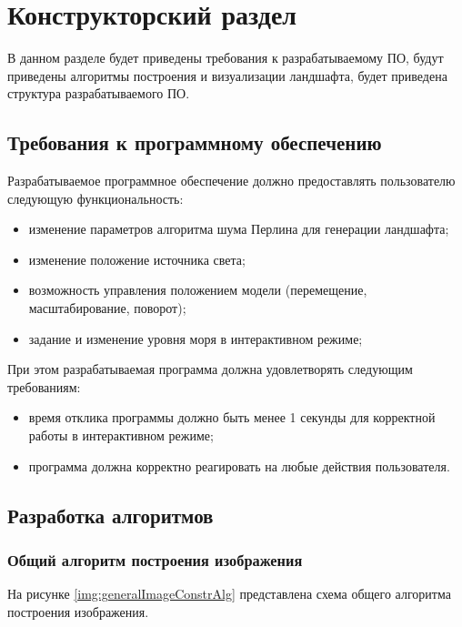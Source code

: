 \chapter{Конструкторский раздел}

В данном разделе будет приведены требования к разрабатываемому ПО, будут приведены алгоритмы построения и визуализации ландшафта, будет приведена структура разрабатываемого ПО.

\section{Требования к программному обеспечению}

Разрабатываемое программное обеспечение должно предоставлять пользователю следующую функциональность:

\begin{itemize}[label=--]
	\item изменение параметров алгоритма шума Перлина для генерации ландшафта;
	\item изменение положение источника света;
	\item возможность управления положением модели (перемещение, масштабирование, поворот);
	\item задание и изменение уровня моря в интерактивном режиме;
\end{itemize}

При этом разрабатываемая программа должна удовлетворять следующим требованиям:

\begin{itemize}[label=--]
	\item время отклика программы должно быть менее 1 секунды для корректной работы в интерактивном режиме;
	\item программа должна корректно реагировать на любые действия пользователя.
\end{itemize}

\section{Разработка алгоритмов}

\subsection{Общий алгоритм построения изображения}

На рисунке \ref{img:generalImageConstrAlg} представлена схема общего алгоритма построения изображения.

